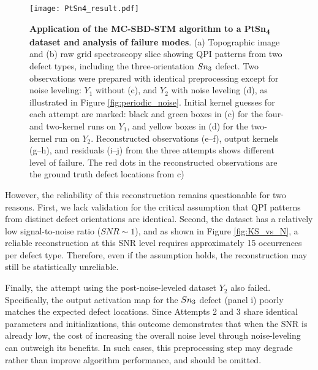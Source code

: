 \begin{figure}
	\texttt{[image: PtSn4\_result.pdf]} 
	\centering
	\caption[\textbf{Application of the MC-SBD-STM algorithm to a PtSn\textsubscript{4} dataset and analysis of failure modes}]{\textbf{Application of the MC-SBD-STM algorithm to a PtSn\textsubscript{4} dataset and analysis of failure modes}. (a) Topographic image and (b) raw grid spectroscopy slice showing QPI patterns from two defect types, including the three-orientation $Sn\textsubscript{3}$ defect. Two observations were prepared with identical preprocessing except for noise leveling: $Y_1$ without (c), and $Y_2$ with noise leveling (d), as illustrated in Figure \ref{fig:periodic_noise}. Initial kernel guesses for each attempt are marked: black and green boxes in (c) for the four- and two-kernel runs on $Y_1$, and yellow boxes in (d) for the two-kernel run on $Y_2$. Reconstructed observations (e–f), output kernels (g–h), and residuals (i–j) from the three attempts shows different level of failure. The red dots in the reconstructed observations are the ground truth defect locations from c)}
	\label{fig:PtSn4}
\end{figure}

However, the reliability of this reconstruction remains questionable for two reasons. First, we lack validation for the critical assumption that QPI patterns from distinct defect orientations are identical. Second, the dataset has a relatively low signal-to-noise ratio ($SNR\sim 1$), and as shown in Figure \ref{fig:KS_vs_N}, a reliable reconstruction at this SNR level requires approximately 15 occurrences per defect type. Therefore, even if the assumption holds, the reconstruction may still be statistically unreliable.

Finally, the attempt using the post-noise-leveled dataset $Y_2$ also failed. Specifically, the output activation map for the $Sn\textsubscript{3}$ defect (panel i) poorly matches the expected defect locations. Since Attempts 2 and 3 share identical parameters and initializations, this outcome demonstrates that when the SNR is already low, the cost of increasing the overall noise level through noise-leveling can outweigh its benefits. In such cases, this preprocessing step may degrade rather than improve algorithm performance, and should be omitted.


